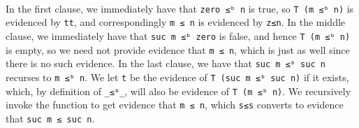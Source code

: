 \begin{fence}
\begin{code}%
\>[0]\AgdaSpace{}%
\AgdaSymbol{:}\AgdaSpace{}%
\AgdaSpace{}%
\AgdaSymbol{(}\AgdaSpace{}%
\AgdaSpace{}%
\AgdaSymbol{:}\AgdaSpace{}%
\AgdaSymbol{)}\AgdaSpace{}%
\AgdaSpace{}%
\AgdaSpace{}%
\AgdaSymbol{(}\AgdaSpace{}%
\AgdaSpace{}%
\AgdaSymbol{)}\AgdaSpace{}%
\AgdaSpace{}%
\AgdaSpace{}%
\AgdaSpace{}%
\<%
\\
\>[0]\AgdaSpace{}%
%
\>[13]%
\>[21]%
\>[25]\AgdaSymbol{=}%
\>[28]\<%
\\
\>[0]\AgdaSpace{}%
\AgdaSymbol{(}\AgdaSpace{}%
\AgdaSymbol{)}\AgdaSpace{}%
%
\>[21]\AgdaSymbol{()}\<%
\\
\>[0]\AgdaSpace{}%
\AgdaSymbol{(}\AgdaSpace{}%
\AgdaSymbol{)}\AgdaSpace{}%
\AgdaSymbol{(}\AgdaSpace{}%
\AgdaSymbol{)}\AgdaSpace{}%
%
\>[25]\AgdaSymbol{=}%
\>[28]\AgdaSpace{}%
\AgdaSymbol{(}\AgdaSpace{}%
\AgdaSpace{}%
\AgdaSpace{}%
\AgdaSymbol{)}\<%
\end{code}
\end{fence}

In the first clause, we immediately have that \texttt{zero\ ≤ᵇ\ n} is
true, so \texttt{T\ (m\ ≤ᵇ\ n)} is evidenced by \texttt{tt}, and
correspondingly \texttt{m\ ≤\ n} is evidenced by \texttt{z≤n}. In the
middle clause, we immediately have that \texttt{suc\ m\ ≤ᵇ\ zero} is
false, and hence \texttt{T\ (m\ ≤ᵇ\ n)} is empty, so we need not provide
evidence that \texttt{m\ ≤\ n}, which is just as well since there is no
such evidence. In the last clause, we have that
\texttt{suc\ m\ ≤ᵇ\ suc\ n} recurses to \texttt{m\ ≤ᵇ\ n}. We let
\texttt{t} be the evidence of \texttt{T\ (suc\ m\ ≤ᵇ\ suc\ n)} if it
exists, which, by definition of \texttt{\_≤ᵇ\_}, will also be evidence
of \texttt{T\ (m\ ≤ᵇ\ n)}. We recursively invoke the function to get
evidence that \texttt{m\ ≤\ n}, which \texttt{s≤s} converts to evidence
that \texttt{suc\ m\ ≤\ suc\ n}.


